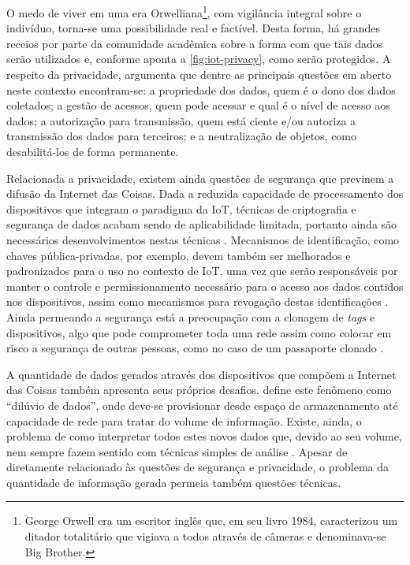 \documentclass[twoside,english,brazilian]{UNISINOSmonografia}
\begin{document}
O medo de viver em uma era Orwelliana\footnote{
	George Orwell era um escritor inglês que, em seu livro 1984, caracterizou 
	um ditador totalitário que vigiava a todos através de câmeras e 
	denominava-se Big Brother.
}, com vigilância integral sobre o indivíduo, torna-se uma possibilidade real 
e factível.
Desta forma, há grandes receios por parte da comunidade acadêmica sobre a 
forma com que tais dados serão utilizados e, conforme aponta a 
\autoref{fig:iot-privacy}, como serão protegidos. 
A respeito da privacidade,  argumenta que dentre as 
principais questões em aberto neste contexto encontram-se: a propriedade dos 
dados, quem é o dono dos dados coletados; a gestão de acessos, quem pode 
acessar e qual é o nível de acesso aos dados; a autorização para transmissão, 
quem está ciente e/ou autoriza a transmissão dos dados para terceiros; e a 
neutralização de objetos, como desabilitá-los de forma permanente.


Relacionada a privacidade, existem ainda questões de segurança que previnem a 
difusão da Internet das Coisas.
Dada a reduzida capacidade de processamento dos dispositivos que integram o 
paradigma da IoT, técnicas de criptografia e segurança de dados acabam sendo 
de aplicabilidade limitada, portanto ainda são necessários desenvolvimentos 
nestas técnicas \cite{Sundmaeker2010}.
Mecanismos de identificação, como chaves pública-privadas, por exemplo, devem 
também ser melhorados e padronizados para o uso no contexto de IoT, uma vez 
que serão responsáveis por manter o controle e permissionamento necessário 
para o acesso aos dados contidos nos dispositivos, assim como mecanismos para 
revogação destas identificações \cite{Buckley2006}.
Ainda permeando a segurança está a preocupação com a clonagem de \textit{tags} 
e dispositivos, algo que pode comprometer toda uma rede assim como colocar em 
risco a segurança de outras pessoas, como no caso de um passaporte clonado 
\cite{ITU2005}. 


A quantidade de dados gerados através dos dispositivos que compõem a Internet 
das Coisas também apresenta seus próprios desafios. 
 define este fenômeno como ``dilúvio de dados'', onde 
deve-se provisionar desde espaço de armazenamento até capacidade de rede para 
tratar do volume de informação. Existe, ainda, o problema de como interpretar 
todos estes novos dados que, devido ao seu volume, nem sempre fazem sentido 
com técnicas simples de análise \cite{ITU2005}.
Apesar de diretamente relacionado às questões de segurança e privacidade, o 
problema da quantidade de informação gerada permeia também questões técnicas.
\end{document}
